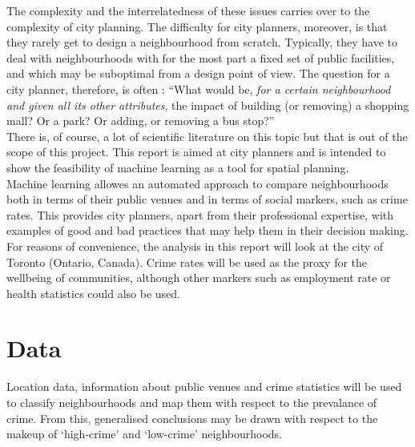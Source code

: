 \documentclass{article}
\begin{document}
The complexity and the interrelatedness of these issues carries over to the complexity of city planning. The difficulty for city planners, moreover, is that they rarely get to design a neighbourhood from scratch. Typically, they have to deal with neighbourhoods with for the most part a fixed set of public facilities, and which may be suboptimal from a design point of view. The question for a city planner, therefore, is often : ``What would be, \emph{for a certain neighbourhood and given all its other attributes}, the impact of building (or removing) a shopping mall? Or a park? Or adding, or removing a bus stop?''\\

There is, of course, a lot of scientific literature on this topic but that is out of the scope of this project. This report is aimed at city planners and is intended to show the feasibility of machine learning as a tool for spatial planning.\\
Machine learning allowes an automated approach to compare neighbourhoods both in terms of their public venues and in terms of social markers, such as crime rates. This provides city planners, apart from their professional expertise, with examples of good and bad practices that may help them in their decision making.\\
For reasons of convenience, the analysis in this report will look at the city of Toronto (Ontario, Canada). Crime rates will be used as the proxy for the wellbeing of communities, although other markers such as employment rate or health statistics could also be used.

\section{Data}
Location data, information about public venues and crime statistics will be used to classify neighbourhoods and map them with respect to the prevalance of crime. From this, generalised conclusions may be drawn with respect to the makeup of `high-crime' and `low-crime' neighbourhoods. 

\end{document}
